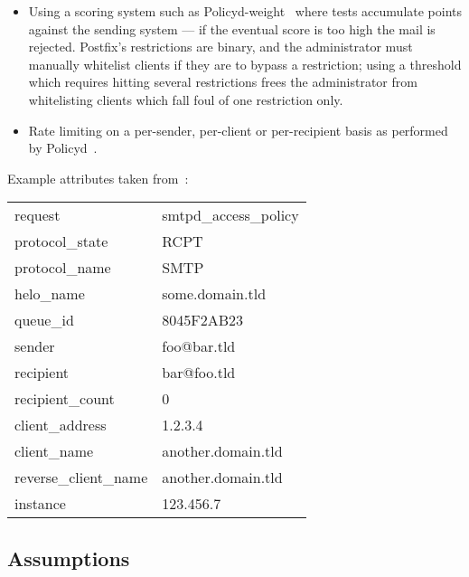 \documentclass[a4paper,12pt,draft]{article}
\begin{document}
\begin{itemize}
    \item Using a scoring system such as
        Policyd-weight~\cite{policyd-weight} where tests accumulate points
        against the sending system --- if the eventual score is too high
        the mail is rejected.  Postfix's restrictions are binary, and the
        administrator must manually whitelist clients if they are to bypass
        a restriction; using a threshold which requires hitting several
        restrictions frees the administrator from whitelisting clients
        which fall foul of one restriction only.

    \item Rate limiting on a per-sender, per-client or per-recipient basis
        as performed by Policyd~\cite{policyd}.

\end{itemize}

Example attributes taken from~\cite{policy-servers}:

\begin{tabular}[]{ll}

    request                 & smtpd\_access\_policy     \\
    protocol\_state         & RCPT                      \\
    protocol\_name          & SMTP                      \\
    helo\_name              & some.domain.tld           \\
    queue\_id               & 8045F2AB23                \\
    sender                  & foo@bar.tld               \\
    recipient               & bar@foo.tld               \\
    recipient\_count        & 0                         \\
    client\_address         & 1.2.3.4                   \\
    client\_name            & another.domain.tld        \\
    reverse\_client\_name   & another.domain.tld        \\
    instance                & 123.456.7                 \\

\end{tabular}



\subsection{Assumptions}
\end{document}
